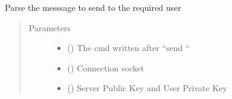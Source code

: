 \documentclass[letterpaper,10pt,english]{sphinxmanual}
\begin{document}
\begin{fulllineitems}
\label{\detokenize{userInputHandler:userInputHandler.sendMessage}}
Parse the messsage to send to the required user
\begin{quote}\begin{description}
\item[{Parameters}] \leavevmode\begin{itemize}
\item {} 
 () \textendash{} The cmd written after “send “

\item {} 
 () \textendash{} Connection socket

\item {} 
 () \textendash{} Server Public Key and User Private Key

\end{itemize}

\end{description}\end{quote}

\end{fulllineitems}

\end{document}
